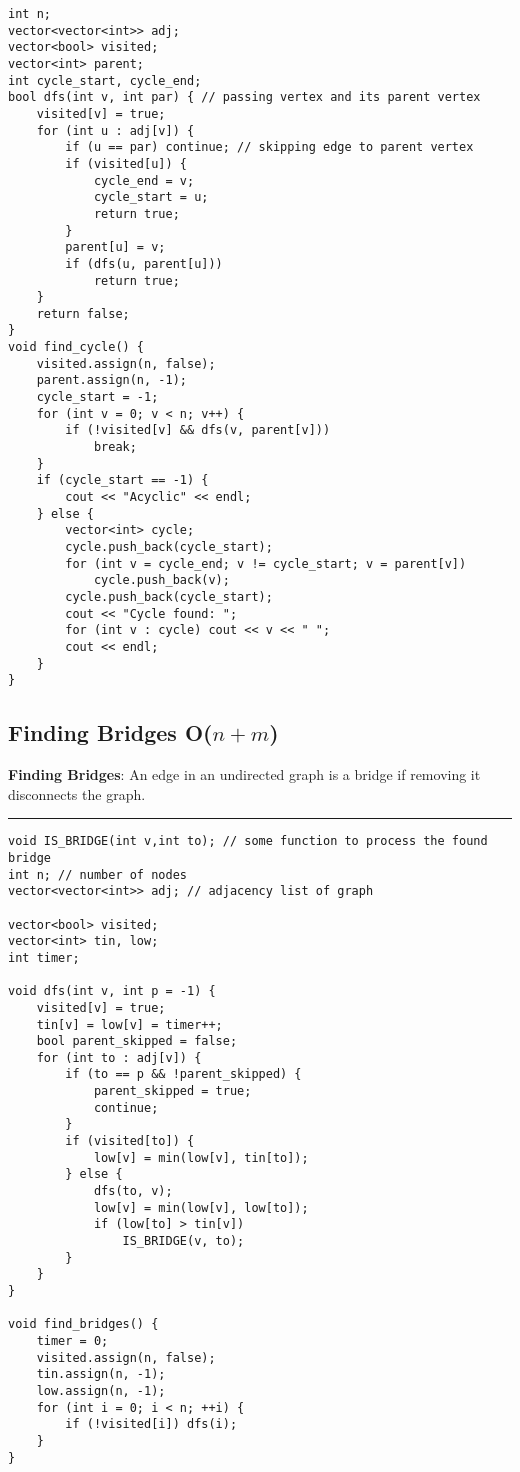 \documentclass{article}
\begin{document}
\begin{verbatim}
int n;
vector<vector<int>> adj;
vector<bool> visited;
vector<int> parent;
int cycle_start, cycle_end;
bool dfs(int v, int par) { // passing vertex and its parent vertex
    visited[v] = true;
    for (int u : adj[v]) {
        if (u == par) continue; // skipping edge to parent vertex
        if (visited[u]) {
            cycle_end = v;
            cycle_start = u;
            return true;
        }
        parent[u] = v;
        if (dfs(u, parent[u]))
            return true;
    }
    return false;
}
void find_cycle() {
    visited.assign(n, false);
    parent.assign(n, -1);
    cycle_start = -1;
    for (int v = 0; v < n; v++) {
        if (!visited[v] && dfs(v, parent[v]))
            break;
    }
    if (cycle_start == -1) {
        cout << "Acyclic" << endl;
    } else {
        vector<int> cycle;
        cycle.push_back(cycle_start);
        for (int v = cycle_end; v != cycle_start; v = parent[v])
            cycle.push_back(v);
        cycle.push_back(cycle_start);
        cout << "Cycle found: ";
        for (int v : cycle) cout << v << " ";
        cout << endl;
    }
}
\end{verbatim}

\pagebreak

\subsection{Finding Bridges O($n + m$)}

\textbf{Finding Bridges}: An edge in an undirected graph is a bridge if removing it disconnects the graph.

\noindent\rule{\textwidth}{1pt}

\begin{verbatim}
void IS_BRIDGE(int v,int to); // some function to process the found bridge
int n; // number of nodes
vector<vector<int>> adj; // adjacency list of graph

vector<bool> visited;
vector<int> tin, low;
int timer;

void dfs(int v, int p = -1) {
    visited[v] = true;
    tin[v] = low[v] = timer++;
    bool parent_skipped = false;
    for (int to : adj[v]) {
        if (to == p && !parent_skipped) {
            parent_skipped = true;
            continue;
        }
        if (visited[to]) {
            low[v] = min(low[v], tin[to]);
        } else {
            dfs(to, v);
            low[v] = min(low[v], low[to]);
            if (low[to] > tin[v])
                IS_BRIDGE(v, to);
        }
    }
}

void find_bridges() {
    timer = 0;
    visited.assign(n, false);
    tin.assign(n, -1);
    low.assign(n, -1);
    for (int i = 0; i < n; ++i) {
        if (!visited[i]) dfs(i);
    }
}
\end{verbatim}
\end{document}
